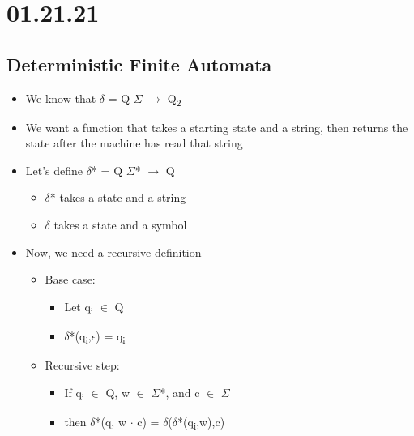 \documentclass[11pt]{article}
\author{Sudhan Chitgopkar}
\date{\today}
\title{}
\begin{document}
\tableofcontents \clearpage\section{01.21.21}
\label{sec:orgfe11621}
\subsection{Deterministic Finite Automata}
\label{sec:org2eb7843}
\begin{itemize}
\item We know that \(\delta\) = Q \texttimes{} \(\Sigma\) \(\to\) Q\textsubscript{2}
\item We want a function that takes a starting state and a string, then returns the state after the machine has read that string
\item Let's define \(\delta\)* = Q \texttimes{} \(\Sigma\)* \(\to\) Q
\begin{itemize}
\item \(\delta\)* takes a state and a string
\item \(\delta\) takes a state and a symbol
\end{itemize}
\item Now, we need a recursive definition
\begin{itemize}
\item Base case:
\begin{itemize}
\item Let q\textsubscript{i} \(\in\) Q
\item \(\delta\)*(q\textsubscript{i},\(\epsilon\)) = q\textsubscript{i}
\end{itemize}
\item Recursive step:
\begin{itemize}
\item If q\textsubscript{i} \(\in\) Q, w \(\in\) \(\Sigma\)*, and c \(\in\) \(\Sigma\)
\item then \(\delta\)*(q, w \(\cdot\) c) = \(\delta\)(\(\delta\)*(q\textsubscript{i},w),c)
\end{itemize}
\end{itemize}
\end{itemize}
\end{document}
